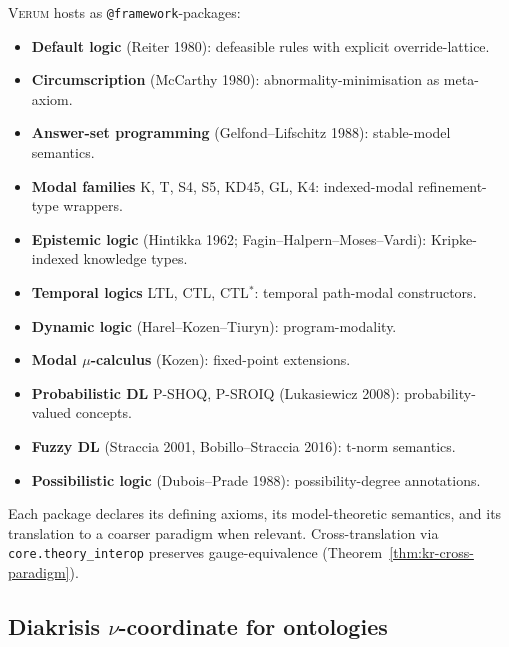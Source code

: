 \documentclass[11pt, a4paper]{article}
\theoremstyle{definition}
\theoremstyle{remark}
\newcommand{\Verum}{\textsc{Verum}}
\begin{document}
\Verum{} hosts as \texttt{@framework}-packages:
\begin{itemize}[nosep]
\item \textbf{Default logic} (Reiter 1980): defeasible rules with explicit override-lattice.
\item \textbf{Circumscription} (McCarthy 1980): abnormality-minimisation as meta-axiom.
\item \textbf{Answer-set programming} (Gelfond--Lifschitz 1988): stable-model semantics.
\item \textbf{Modal families} K, T, S4, S5, KD45, GL, K4: indexed-modal refinement-type wrappers.
\item \textbf{Epistemic logic} (Hintikka 1962; Fagin--Halpern--Moses--Vardi): Kripke-indexed knowledge types.
\item \textbf{Temporal logics} LTL, CTL, CTL$^{\ast}$: temporal path-modal constructors.
\item \textbf{Dynamic logic} (Harel--Kozen--Tiuryn): program-modality.
\item \textbf{Modal $\mu$-calculus} (Kozen): fixed-point extensions.
\item \textbf{Probabilistic DL} P-\textsf{SHOQ}, P-\textsf{SROIQ} (Lukasiewicz 2008): probability-valued concepts.
\item \textbf{Fuzzy DL} (Straccia 2001, Bobillo--Straccia 2016): t-norm semantics.
\item \textbf{Possibilistic logic} (Dubois--Prade 1988): possibility-degree annotations.
\end{itemize}
Each package declares its defining axioms, its model-theoretic semantics, and its translation to a coarser paradigm when relevant. Cross-translation via \texttt{core.theory\_interop} preserves gauge-equivalence (Theorem~\ref{thm:kr-cross-paradigm}).

\subsection{Diakrisis $\nu$-coordinate for ontologies}
\label{subsec:kr-nu-coord}
\end{document}
